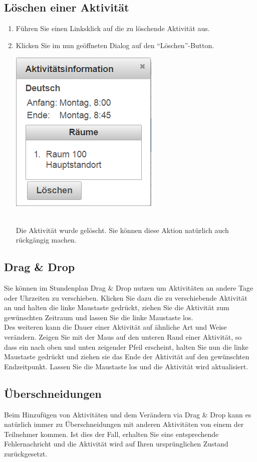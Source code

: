 \documentclass[fontsize=12pt]{scrartcl}
\begin{document}
\subsection{Löschen einer Aktivität}
\begin{enumerate}
\item Führen Sie einen Linksklick auf die zu löschende Aktivität aus.
\item Klicken Sie im nun geöffneten Dialog auf den "`Löschen"'-Button. \medskip\\
	\begin{minipage}[t]{\linewidth}
            \includegraphics[width=.3\linewidth]{images/deleteActivity.png}
    \end{minipage} 
    \medskip\\
    Die Aktivität wurde gelöscht. Sie können diese Aktion natürlich auch rückgängig machen.
\end{enumerate}

\subsection{Drag \& Drop}
Sie können im Stundenplan Drag \& Drop nutzen um Aktivitäten an andere Tage oder Uhrzeiten zu verschieben. Klicken Sie dazu die zu verschiebende Aktivität an und halten die linke Maustaste gedrückt, ziehen Sie die Aktivität zum gewünschten Zeitraum und lassen Sie die linke Maustaste los.\\
Des weiteren kann die Dauer einer Aktivität auf ähnliche Art und Weise verändern. Zeigen Sie mit der Maus auf den unteren Rand einer Aktivität, so dass ein nach oben und unten zeigender Pfeil erscheint, halten Sie nun die linke Maustaste gedrückt und ziehen sie das Ende der Aktivität auf den gewünschten Endzeitpunkt. Lassen Sie die Maustaste los und die Aktivität wird aktualisiert. \\

\subsection{Überschneidungen}
Beim Hinzufügen von Aktivitäten und dem Verändern via Drag \& Drop kann es natürlich immer zu Überschneidungen mit anderen Aktivitäten von einem der Teilnehmer kommen. Ist dies der Fall, erhalten Sie eine entsprechende Fehlernachricht und die Aktivität wird auf Ihren ursprünglichen Zustand zurückgesetzt.
\end{document}
